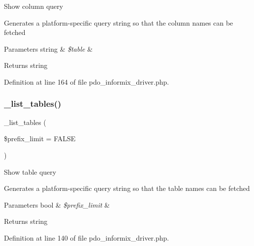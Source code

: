 Show column query

Generates a platform-\/specific query string so that the column names can be fetched


\begin{DoxyParams}[1]{Parameters}
string & {\em \$table} & \\
\hline
\end{DoxyParams}
\begin{DoxyReturn}{Returns}
string 
\end{DoxyReturn}


Definition at line 164 of file pdo\+\_\+informix\+\_\+driver.\+php.

\mbox{\label{class_c_i___d_b__pdo__informix__driver_a435c0f3ce54fe7daa178baa8532ebd54}} 
\subsubsection{\texorpdfstring{\_list\_tables()}{\_list\_tables()}}
{\footnotesize\ttfamily \+\_\+list\+\_\+tables (\begin{DoxyParamCaption}\item[{}]{\$prefix\+\_\+limit = {\ttfamily FALSE} }\end{DoxyParamCaption})\hspace{0.3cm}{\ttfamily [protected]}}

Show table query

Generates a platform-\/specific query string so that the table names can be fetched


\begin{DoxyParams}[1]{Parameters}
bool & {\em \$prefix\+\_\+limit} & \\
\hline
\end{DoxyParams}
\begin{DoxyReturn}{Returns}
string 
\end{DoxyReturn}


Definition at line 140 of file pdo\+\_\+informix\+\_\+driver.\+php.

\mbox{\label{class_c_i___d_b__pdo__informix__driver_aa029600528fc1ce660a23ff4b4667f95}} 
